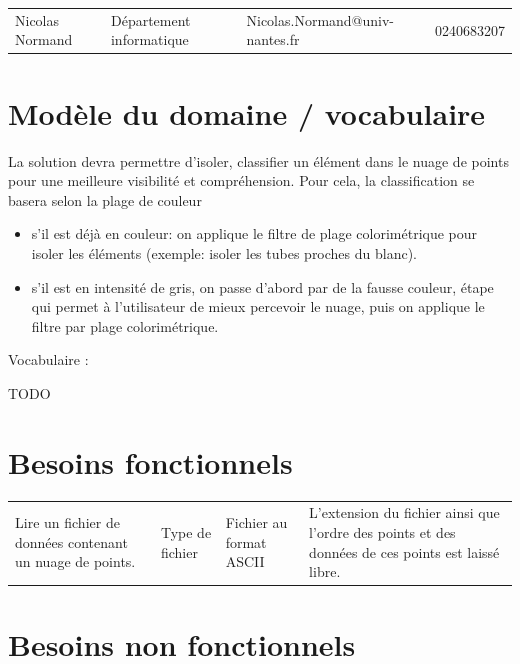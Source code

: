 \documentclass[12pt,titlepage,french]{article}
\begin{document}
\noindent\begin{tabu} to \textwidth {X[c2]X[c2]X[c3]X[c]}\toprule
     &&                       &\\\toprule
Nicolas Normand& Département informatique&Nicolas.Normand@univ-nantes.fr&    0240683207\\\bottomrule
\end{tabu}

\section{Modèle du domaine / vocabulaire}

La solution devra permettre d’isoler, classifier un élément dans le nuage de points pour une meilleure visibilité et compréhension. Pour cela, la classification se basera selon la plage de couleur
\begin{itemize}
	\item  s'il est déjà en couleur: on applique le filtre de plage colorimétrique pour isoler les éléments (exemple: isoler les tubes proches du blanc).\par

	\item  s'il est en intensité de gris, on passe d'abord par de la fausse couleur, étape qui permet à l'utilisateur de mieux percevoir le nuage, puis on applique le filtre par plage colorimétrique.\par

\end{itemize}

Vocabulaire :

TODO

\section{Besoins fonctionnels}

\noindent\begin{tabu} to \textwidth {X[c2]X[c]X[c]X[c3]}\toprule
     &&                       &\\\toprule
Lire un fichier de données contenant un nuage de points.
& Type de fichier
& Fichier au format ASCII
& L'extension du fichier ainsi que l'ordre des points et des données de ces points est laissé libre.\\\bottomrule
\end{tabu}


\section{Besoins non fonctionnels}
\end{document}
